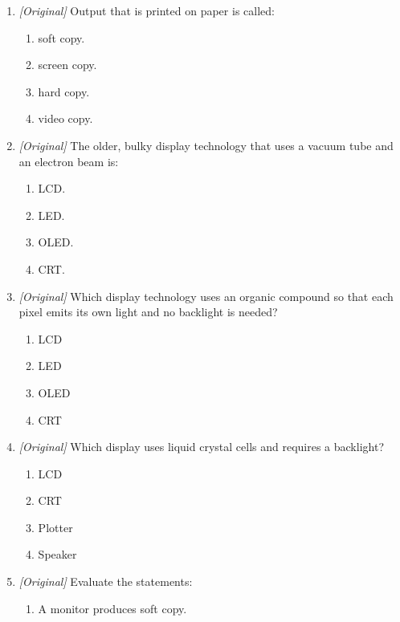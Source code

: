 \documentclass[11pt]{article}
\begin{document}
\begin{enumerate}[label=\textbf{Q\arabic*.}, leftmargin=*]
  is called:
  \begin{enumerate}[label=\Alph*.]
    \item hard copy.
    \item soft copy.
    \item backup copy.
    \item master copy.
  \end{enumerate}
\item \textit{[Original]} Output that is printed on paper is called:
  \begin{enumerate}[label=\Alph*.]
    \item soft copy.
    \item screen copy.
    \item hard copy.
    \item video copy.
  \end{enumerate}
\item \textit{[Original]} The older, bulky display technology that uses a
  vacuum tube and an electron beam is:
  \begin{enumerate}[label=\Alph*.]
    \item LCD.
    \item LED.
    \item OLED.
    \item CRT.
  \end{enumerate}
\item \textit{[Original]} Which display technology uses an organic compound so
  that each pixel emits its own light and no backlight is needed?
  \begin{enumerate}[label=\Alph*.]
    \item LCD
    \item LED
    \item OLED
    \item CRT
  \end{enumerate}
\item \textit{[Original]} Which display uses liquid crystal cells and requires
  a backlight?
  \begin{enumerate}[label=\Alph*.]
    \item LCD
    \item CRT
    \item Plotter
    \item Speaker
  \end{enumerate}
\item \textit{[Original]} Evaluate the statements:
  \begin{enumerate}[label=\Roman*.]
    \item A monitor produces soft copy.

\end{enumerate}
\end{enumerate}
\end{document}
